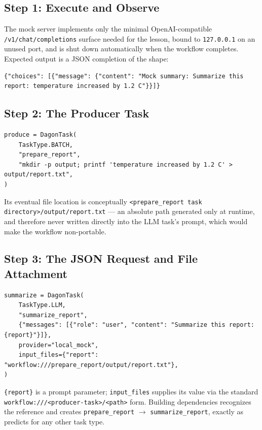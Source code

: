\subsection{Step 1: Execute and Observe}

The mock server implements only the minimal OpenAI-compatible
\texttt{/v1/chat/completions} surface needed for the lesson, bound to
\texttt{127.0.0.1} on an unused port, and is shut down automatically when the
workflow completes. Expected output is a JSON completion of the shape:

\begin{lstlisting}
{"choices": [{"message": {"content": "Mock summary: Summarize this report: temperature increased by 1.2 C"}}]}
\end{lstlisting}

\subsection{Step 2: The Producer Task}

\begin{lstlisting}
produce = DagonTask(
    TaskType.BATCH,
    "prepare_report",
    "mkdir -p output; printf 'temperature increased by 1.2 C' > output/report.txt",
)
\end{lstlisting}

Its eventual file location is conceptually
\texttt{<prepare\_report task directory>/output/report.txt} --- an absolute
path generated only at runtime, and therefore never written directly into
the LLM task's prompt, which would make the workflow non-portable.

\subsection{Step 3: The JSON Request and File Attachment}

\begin{lstlisting}
summarize = DagonTask(
    TaskType.LLM,
    "summarize_report",
    {"messages": [{"role": "user", "content": "Summarize this report: {report}"}]},
    provider="local_mock",
    input_files={"report": "workflow:///prepare_report/output/report.txt"},
)
\end{lstlisting}

\texttt{\{report\}} is a prompt parameter; \texttt{input\_files} supplies its
value via the standard \texttt{workflow:///<producer-task>/<path>} form.
Building dependencies recognizes the reference and creates
\texttt{prepare\_report} $\to$ \texttt{summarize\_report}, exactly as
 predicts for any other task type.

